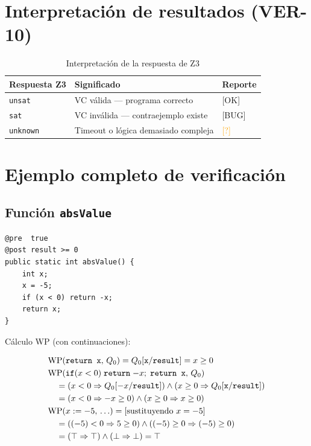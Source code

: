 \section{Interpretación de resultados (VER-10)}

\begin{table}[H]
  \centering
  \caption{Interpretación de la respuesta de Z3}
  \label{tab:z3resp}
  \begin{tabular}{lll}
    \toprule
    \textbf{Respuesta Z3} & \textbf{Significado}         & \textbf{Reporte} \\
    \midrule
    \texttt{unsat}    & VC válida — programa correcto      & \textcolor{green!50!black}{[OK]} \\
    \texttt{sat}      & VC inválida — contraejemplo existe & \textcolor{red!80!black}{[BUG]} \\
    \texttt{unknown}  & Timeout o lógica demasiado compleja & \textcolor{orange}{[?]} \\
    \bottomrule
  \end{tabular}
\end{table}

\section{Ejemplo completo de verificación}

\subsection{Función \texttt{absValue}}

\begin{lstlisting}[style=java, caption={Método verificado: valor absoluto}]
@pre  true
@post result >= 0
public static int absValue() {
    int x;
    x = -5;
    if (x < 0) return -x;
    return x;
}
\end{lstlisting}

Cálculo WP (con continuaciones):

\begin{align*}
  &\mathrm{WP}(\texttt{return x},\,Q_0) = Q_0[\texttt{x}/\texttt{result}] = x \geq 0 \\
  &\mathrm{WP}(\texttt{if}(x<0)\;\texttt{return}\;{-x};\;\texttt{return x},\,Q_0) \\
  &\quad = (x < 0 \Rightarrow Q_0[{-x}/\texttt{result}])
         \wedge (x \geq 0 \Rightarrow Q_0[\texttt{x}/\texttt{result}]) \\
  &\quad = (x < 0 \Rightarrow -x \geq 0) \wedge (x \geq 0 \Rightarrow x \geq 0) \\
  &\mathrm{WP}(x := -5,\,\ldots) = [\text{sustituyendo } x = -5] \\
  &\quad = ((-5) < 0 \Rightarrow 5 \geq 0) \wedge ((-5) \geq 0 \Rightarrow (-5) \geq 0) \\
  &\quad = (\top \Rightarrow \top) \wedge (\bot \Rightarrow \bot) = \top
\end{align*}

